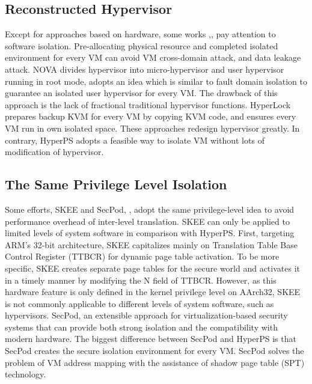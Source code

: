 \documentclass[10pt, numbers, preprint ]{sigplanconf}
\begin{document}
{\subsection{Reconstructed Hypervisor} \label{subsec:recnsthp}
Except for approaches based on hardware, some works \cite{DBLP:conf/ndss/ShiWXDCZL17},\cite{DBLP:conf/eurosys/SteinbergK10},\cite{DBLP:conf/eurosys/WangWGJ12} pay attention to software isolation. Pre-allocating physical resource and completed isolated environment for every VM can avoid VM cross-domain attack, and data leakage attack. NOVA \cite{DBLP:conf/eurosys/SteinbergK10} divides hypervisor into micro-hypervisor and user hypervisor running in root mode, adopts an idea which is similar to fault domain isolation to guarantee an isolated user hypervisor for every VM. The drawback of this approach is the lack of fractional traditional hypervisor functions. HyperLock \cite{DBLP:conf/eurosys/WangWGJ12} prepares backup KVM for every VM by copying KVM code, and ensures every VM run in own isolated space. These approaches redesign hypervisor greatly. In contrary, HyperPS adopts a feasible way to isolate VM without lots of modification of hypervisor.

\subsection{The Same Privilege Level Isolation} \label{subsec:tspli}
Some efforts, SKEE\cite{DBLP:conf/ndss/AzabSBMSWN16} and SecPod\cite{DBLP:conf/usenix/WangCWQZ15}, \cite{DBLP:conf/vee/DengLXCZ17}, adopt the same privilege-level idea to avoid performance overhead of inter-level translation. SKEE can only be applied to limited levels of system software in comparison with HyperPS. First, targeting ARM’s 32-bit architecture, SKEE capitalizes mainly on Translation Table Base Control Register (TTBCR) for dynamic page table activation. To be more specific, SKEE creates separate page tables for the secure world and activates it in a timely manner by modifying the N field of TTBCR. However, as this hardware feature is only defined in the kernel privilege level on AArch32, SKEE is not commonly applicable to different levels of system software, such as hypervisors. SecPod, an extensible approach for virtualization-based security systems that can provide both strong isolation and the compatibility with modern hardware. The biggest difference between SecPod and HyperPS is that SecPod creates the secure isolation environment for every VM. SecPod solves the problem of VM address mapping with the assistance of shadow page table (SPT) technology.

}
\end{document}
